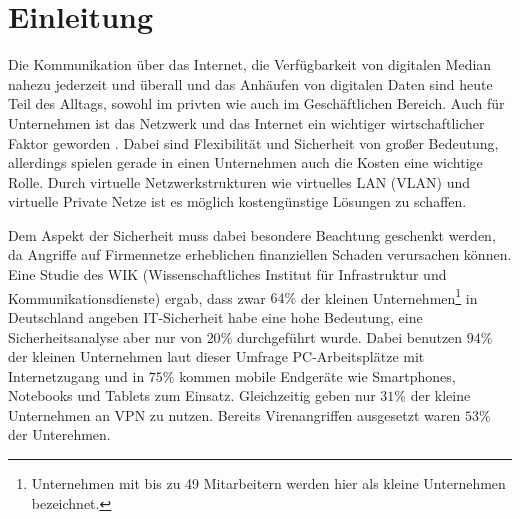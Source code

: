 \chapter{Einleitung}



Die Kommunikation über das Internet, die Verfügbarkeit von digitalen Median nahezu jederzeit und überall und das Anhäufen von digitalen Daten  sind  heute Teil des Alltags, sowohl im privten wie auch im Geschäftlichen Bereich. Auch für Unternehmen  ist das Netzwerk und das Internet ein wichtiger wirtschaftlicher Faktor geworden \cite{lipp2007vpn}. Dabei sind  Flexibilität und Sicherheit von großer Bedeutung, allerdings spielen gerade in einen Unternehmen auch die Kosten eine wichtige Rolle. Durch virtuelle Netzwerkstrukturen wie virtuelles LAN (VLAN) und virtuelle Private Netze ist es möglich kostengünstige Lösungen zu schaffen. 

Dem Aspekt der Sicherheit muss dabei besondere Beachtung geschenkt werden, da Angriffe auf Firmennetze erheblichen finanziellen Schaden verursachen können.\\  

Eine Studie des WIK (Wissenschaftliches Institut für Infrastruktur und Kommunikationsdienste) \cite{wik2017KMU} ergab, dass zwar $64\%$ der kleinen Unternehmen\footnote{Unternehmen mit bis zu 49 Mitarbeitern werden hier als kleine Unternehmen bezeichnet.} in Deutschland angeben IT-Sicherheit habe eine hohe Bedeutung, eine Sicherheitsanalyse aber nur von $20\%$ durchgeführt wurde.
Dabei benutzen $94\%$ der kleinen Unternehmen laut dieser Umfrage PC-Arbeitsplätze mit Internetzugang und in $ 75\% $ kommen mobile Endgeräte wie Smartphones, Notebooks und Tablets zum Einsatz. Gleichzeitig geben nur $31\%$ der kleine Unternehmen an VPN zu nutzen. Bereits Virenangriffen ausgesetzt waren $53\%$ der Unterehmen. 
































